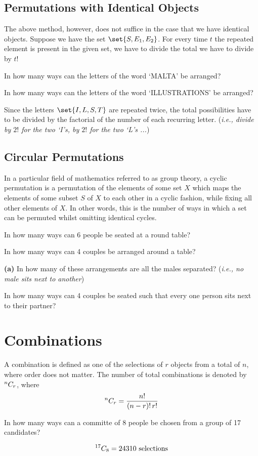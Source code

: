 	\subsection{Permutations with Identical Objects}
	The above method, however, does not suffice in the case that we have identical objects. Suppose we have the set $\set{S,E_1,E_2}$. For every time $t$ the repeated element is present in the given set, we have to divide the total we have to divide by $t!$
	\begin{example}
		In how many ways can the letters of the word `MALTA' be arranged?
	\end{example}
	
	\begin{example}
		In how many ways can the letters of the word `ILLUSTRATIONS' be arranged?
	\end{example}
	Since the letters $\set{I,L,S,T}$ are repeated twice, the total possibilities have to be divided by the factorial of the number of each recurring letter. (\textit{i.e., divide by $2!$ for the two `I's, by $2!$ for the two `L's ...})
	
	\subsection{Circular Permutations}
	In a particular field of mathematics referred to as group theory, a cyclic permutation is a permutation of the elements of some set $X$ which maps the elements of some subset $S$ of $X$ to each other in a cyclic fashion, while fixing all other elements of $X$. In other words, this is the number of ways in which a set can be permuted whilst omitting identical cycles.
	\begin{example}
		In how many ways can 6 people be seated at a round table?
	\end{example}
	
	\begin{example}
		In how many ways can 4 couples be arranged around a table?
		
		\quad\textbf{(a)} In  how many of these arrangements are all the males separated? (\textit{i.e., no male sits next to another})
	\end{example}
	\begin{example}
		In how many ways can 4 couples be seated such that every one person sits next to their partner?
	\end{example}
	
	\section{Combinations}
 A combination is defined as one of the selections of $r$ objects from a total of $n$, where order does not matter. The number of total combinations is denoted by $\permcomb{C}{n}{r}$, where \[\permcomb{C}{n}{r} = \frac{n!}{(n-r)!\,r!}\]
	\begin{example}
		In how many ways can a committe of 8 people be chosen from a group of 17 candidates?
	\end{example}
	\[\permcomb{C}{17}{8} = 24310 \text{ selections}\]
	
